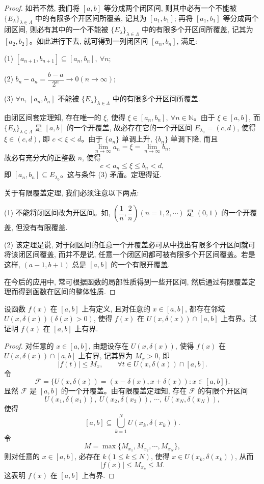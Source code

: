 \begin{proof}
如若不然, 我们将 $[a,b]$ 等分成两个闭区间, 则其中必有一个不能被 $\{E_\lambda\}_{\lambda\in\Lambda}$ 中的有限多个开区间所覆盖, 记其为 $[a_1,b_1]$; 再将 $[a_1,b_1]$ 等分成两个闭区间, 则必有其中的一个不能被 $\{E_\lambda\}_{\lambda\in\Lambda}$ 中的有限多个开区间所覆盖, 记其为 $[a_2,b_2]$。如此进行下去, 就可得到一列闭区间 $[a_n,b_n]$, 满足:

(1) $[a_{n+1},b_{n+1}]\subseteq[a_n,b_n],\ \forall n$;

(2) $b_n-a_n=\dfrac{b-a}{2^n}\to0(n\to\infty)$;

(3) $\forall n$, $[a_n,b_n]$ 不能被 $\{E_\lambda\}_{\lambda\in\Lambda}$ 中的有限多个开区间所覆盖.

由闭区间套定理知, 存在唯一的 $\xi$, 使得 $\xi\in[a_n,b_n],\ \forall n\in\mathbb{N}$。由于 $\xi\in[a,b]$, 而 $\{E_\lambda\}_{\lambda\in\Lambda}$ 是 $[a,b]$ 的一个开覆盖, 故必存在它的一个开区间 $E_{\lambda_0}=(c,d)$, 使得 $\xi\in(c,d)$, 即 $c<\xi<d$。由于 $\{a_n\}$ 单调上升, $\{b_n\}$ 单调下降, 而且
\[
  \lim_{n\to\infty}a_n=\xi=\lim_{n\to\infty}b_n,
\]
故必有充分大的正整数 $n$, 使得
\[
  c<a_n\leqslant\xi\leqslant b_n<d,
\]
即 $[a_n,b_n]\subseteq E_{\lambda_0}$。这与条件 (3) 矛盾。定理得证.

关于有限覆盖定理, 我们必须注意以下两点:

(1) 不能将闭区间改为开区间。如, $\left(\dfrac1n,\dfrac2n\right)(n=1,2,\cdots)$ 是 $(0,1)$ 的一个开覆盖, 但没有有限覆盖.

(2) 该定理是说, 对于闭区间的任意一个开覆盖必可从中找出有限多个开区间就可将该闭区间覆盖, 而并不是说, 任意一个闭区间都可被有限多个开区间覆盖。若是这样, $(a-1,b+1)$ 总是 $[a,b]$ 的一个有限开覆盖.

在今后的应用中, 常可根据函数的局部性质得到一些开区间, 然后通过有限覆盖定理而得到函数在区间的整体性质.
\end{proof}


\begin{example}\label{example:ma-2-4-2}
设函数 $f(x)$ 在 $[a,b]$ 上有定义, 且对任意的 $x\in[a,b]$, 都存在邻域 $U(x,\delta(x))(\delta(x)>0)$, 使得 $f(x)$ 在 $U(x,\delta(x))\cap[a,b]$ 上有界。试证明 $f(x)$ 在 $[a,b]$ 上有界.
\end{example}


\begin{proof}
对任意的 $x\in[a,b]$, 由题设存在 $U(x,\delta(x))$, 使得 $f(x)$ 在 $U(x,\delta(x))\cap[a,b]$ 上有界, 记其界为 $M_x>0$, 即
\[
  |f(t)|\leqslant M_x,\qquad \forall t\in U(x,\delta(x))\cap[a,b].
\]
令
\[
  \mathcal{F}=\{U(x,\delta(x))=(x-\delta(x),x+\delta(x)):x\in[a,b]\}.
\]
显然 $\mathcal{F}$ 是 $[a,b]$ 的一个开覆盖。由有限覆盖定理知, 存在 $\mathcal{F}$ 的有限个开区间
\[
  U(x_1,\delta(x_1)),\ U(x_2,\delta(x_2)),\ \cdots,\ U(x_N,\delta(x_N)),
\]
使得
\[
  [a,b]\subseteq\bigcup_{k=1}^N U(x_k,\delta(x_k)).
\]
令
\[
  M=\max\{M_{x_1},M_{x_2},\cdots,M_{x_N}\},
\]
则对任意的 $x\in[a,b]$, 必存在 $k(1\leqslant k\leqslant N)$, 使得 $x\in U(x_k,\delta(x_k))$, 从而
\[
  |f(x)|\leqslant M_{x_k}\leqslant M.
\]
这表明 $f(x)$ 在 $[a,b]$ 上有界.
\end{proof}



